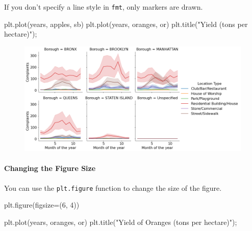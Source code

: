 \documentclass[
  letterpaper,
  DIV=11,
  numbers=noendperiod]{scrreprt}
\let\oldparagraph\paragraph
\renewcommand{\paragraph}[1]{\oldparagraph{#1}\mbox{}}
\newenvironment{Shaded}{\begin{snugshade}}{\end{snugshade}}
\newcommand{\DecValTok}[1]{\textcolor[rgb]{0.68,0.00,0.00}{#1}}
\newcommand{\NormalTok}[1]{\textcolor[rgb]{0.00,0.23,0.31}{#1}}
\newcommand{\OperatorTok}[1]{\textcolor[rgb]{0.37,0.37,0.37}{#1}}
\newcommand{\StringTok}[1]{\textcolor[rgb]{0.13,0.47,0.30}{#1}}
\begin{document}
If you don't specify a line style in \texttt{fmt}, only markers are
drawn.

\begin{Shaded}
\begin{Highlighting}[]
\NormalTok{plt.plot(years, apples, }\StringTok{\textquotesingle{}sb\textquotesingle{}}\NormalTok{)}
\NormalTok{plt.plot(years, oranges, }\StringTok{\textquotesingle{}or\textquotesingle{}}\NormalTok{)}
\NormalTok{plt.title(}\StringTok{"Yield (tons per hectare)"}\NormalTok{)}\OperatorTok{;}
\end{Highlighting}
\end{Shaded}

\begin{figure}[H]

{\centering \includegraphics{Data visualization_files/figure-pdf/cell-28-output-1.png}

}

\end{figure}

\hypertarget{changing-the-figure-size}{%
\paragraph{Changing the Figure Size}\label{changing-the-figure-size}}

You can use the \texttt{plt.figure} function to change the size of the
figure.

\begin{Shaded}
\begin{Highlighting}[]
\NormalTok{plt.figure(figsize}\OperatorTok{=}\NormalTok{(}\DecValTok{6}\NormalTok{, }\DecValTok{4}\NormalTok{))}

\NormalTok{plt.plot(years, oranges, }\StringTok{\textquotesingle{}or\textquotesingle{}}\NormalTok{)}
\NormalTok{plt.title(}\StringTok{"Yield of Oranges (tons per hectare)"}\NormalTok{)}\OperatorTok{;}
\end{Highlighting}
\end{Shaded}
\end{document}
